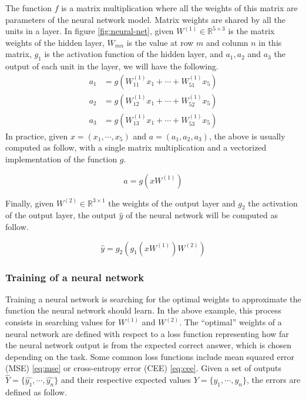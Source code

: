 The function $f$ is a matrix multiplication where all the weights of this matrix
are parameters of the neural network model. Matrix weights are shared by all the
units in a layer. In figure \ref{fig:neural-net}, given $W^{(1)} \in
\mathbb{R}^{5\times 3}$ is the matrix weights of the hidden layer, $W_{mn}$ is
the value at row $m$ and column $n$ in this matrix, $g_1$ is the activation
function of the hidden layer, and $a_1, a_2$ and $a_3$ the output of each unit
in the layer, we will have the following.
\begin{align*}
  a_1 &= g\left( W_{11}^{(1)}x_1 + \cdots + W_{51}^{(1)}x_5 \right)\\
  a_2 &= g\left( W_{12}^{(1)}x_1 + \cdots + W_{52}^{(1)}x_5 \right)\\
  a_3 &= g\left(W_{13}^{(1)}x_1 + \cdots + W_{53}^{(1)}x_5 \right)
\end{align*}
In practice, given $x = (x_1, \cdots, x_5)$ and $a = (a_1, a_2, a_3)$, the above
is usually computed as follow, with a single matrix multiplication and a
vectorized implementation of the function $g$.

\[ a = g\left(  x W^{(1)}  \right) \]

Finally, given $W^{(2)} \in \mathbb{R}^{3\times 1}$ the weights of the output
layer and $g_2$ the activation of the output layer, the output $\hat{y}$ of the neural
network will be computed as follow.

\begin{equation}
  \hat{y} = g_2\left( g_1\left( x W^{(1)} \right) W^{(2)} \right)
\end{equation}
\subsubsection{Training of a neural network}
Training a neural network is searching for the optimal weights to approximate
the function the neural network should learn. In the above example, this process
consists in searching values for $W^{(1)}$ and $W^{(2)}$.
The ``optimal'' weights of a neural network are defined with respect to a loss
function representing how far the neural network output is from the expected
correct answer, which is chosen depending on the task. Some common loss
functions include mean squared error (MSE) \ref{eq:mse} or cross-entropy
error (CEE) \ref{eq:cee}. Given a set of outputs $\hat{Y} = \{ \hat{y_1}, \cdots,
\hat{y_n} \}$ and their respective expected values $Y = \{ y_1, \cdots,
y_n \}$, the errors are defined as follow.


